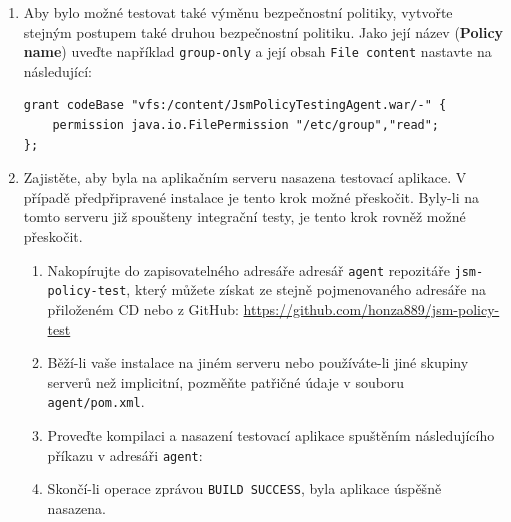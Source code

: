 \begin{enumerate}
  \item Aby bylo možné testovat také výměnu bezpečnostní politiky, vytvořte stejným postupem také druhou bezpečnostní politiku. Jako její název ({\bf Policy name}) uveďte například {\tt group-only} a její obsah {\tt File content} nastavte na následující:
  \begin{lstlisting}
grant codeBase "vfs:/content/JsmPolicyTestingAgent.war/-" {
    permission java.io.FilePermission "/etc/group","read";
};
  \end{lstlisting}
  \item Zajistěte, aby byla na aplikačním serveru nasazena testovací aplikace. V případě předpřipravené instalace je tento krok možné přeskočit. Byly-li na tomto serveru již spoušteny integrační testy, je tento krok rovněž možné přeskočit.
  \begin{enumerate}
    \item Nakopírujte do zapisovatelného adresáře adresář {\tt agent} repozitáře {\tt jsm-policy-test}, který můžete získat ze stejně pojmenovaného adresáře na přiloženém CD nebo z GitHub:
      \newline\url{https://github.com/honza889/jsm-policy-test}
    \item Běží-li vaše instalace na jiném serveru nebo používáte-li jiné skupiny serverů než implicitní, pozměňte patřičné údaje v souboru {\tt agent/pom.xml}.
    \item Proveďte kompilaci a nasazení testovací aplikace spuštěním následujícího příkazu v adresáři {\tt agent}:
    \item Skončí-li operace zprávou {\tt BUILD SUCCESS}, byla aplikace úspěšně nasazena.
  \end{enumerate}
  

\end{enumerate}
